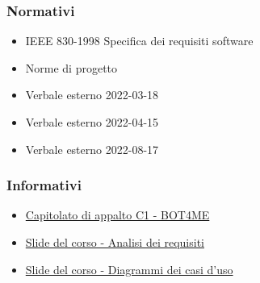 \subsubsection{Normativi}
\begin{itemize}
    \item IEEE 830-1998 Specifica dei requisiti software
    \item Norme di progetto {\docVersionNdP}
    \item Verbale esterno 2022-03-18
    \item Verbale esterno 2022-04-15
    \item Verbale esterno 2022-08-17
\end{itemize}

\subsubsection{Informativi}
\begin{itemize}
    \item \href{https://www.math.unipd.it/~tullio/IS-1/2021/Progetto/C1.pdf}{\color{blue} Capitolato di appalto C1 - BOT4ME}
    \item \href{https://www.math.unipd.it/~tullio/IS-1/2021/Dispense/T07.pdf}{\color{blue} Slide del corso - Analisi dei requisiti}
    \item \href{https://www.math.unipd.it/~rcardin/swea/2022/Diagrammi%20Use%20Case.pdf}{\color{blue} Slide del corso - Diagrammi dei casi d'uso}
\end{itemize}
\newpage